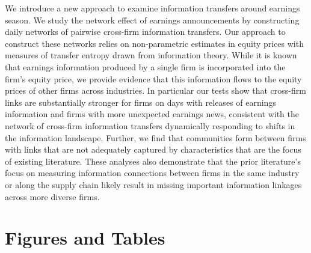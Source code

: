 We introduce a new approach to examine information transfers around earnings season.  We study the network effect of earnings announcements by constructing daily networks of pairwise cross-firm information transfers.  Our approach to construct these networks relies on non-parametric estimates in equity prices with measures of transfer entropy drawn from information theory.  While it is known that earnings information produced by a single firm is incorporated into the firm's equity price,  we provide evidence that this information flows to the equity prices of other firms across industries.  In particular our tests show that cross-firm links are substantially stronger for firms on days with releases of earnings information and firms with more unexpected earnings news, consistent with the network of cross-firm information transfers dynamically responding to shifts in the information landscape.  Further,  we find that communities form between firms with links that are not adequately captured by characteristics that are the focus of existing literature.  These analyses also demonstrate that the prior literature’s focus on measuring information connections between firms in the same industry or along the supply chain likely result in missing important information linkages across more diverse firms. 





\newpage
\section{Figures and Tables}




